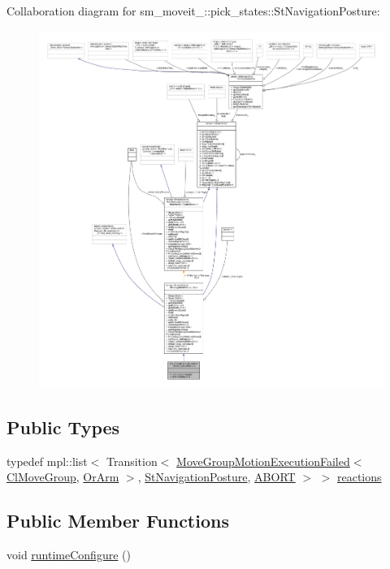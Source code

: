 Collaboration diagram for sm\+\_\+moveit\+\_\+:\+:pick\+\_\+states\+:\+:St\+Navigation\+Posture\+:
\nopagebreak
\begin{figure}[H]
\begin{center}
\leavevmode
\includegraphics[width=350pt]{structsm__moveit__4_1_1pick__states_1_1StNavigationPosture__coll__graph}
\end{center}
\end{figure}
\subsection*{Public Types}
\begin{DoxyCompactItemize}
\item 
typedef mpl\+::list$<$ Transition$<$ \hyperlink{structmoveit__z__client_1_1MoveGroupMotionExecutionFailed}{Move\+Group\+Motion\+Execution\+Failed}$<$ \hyperlink{classmoveit__z__client_1_1ClMoveGroup}{Cl\+Move\+Group}, \hyperlink{classsm__moveit__4_1_1OrArm}{Or\+Arm} $>$, \hyperlink{structsm__moveit__4_1_1pick__states_1_1StNavigationPosture}{St\+Navigation\+Posture}, \hyperlink{classABORT}{A\+B\+O\+RT} $>$ $>$ \hyperlink{structsm__moveit__4_1_1pick__states_1_1StNavigationPosture_a8f3ad7c040b08e1da62aabb3caa6a8e9}{reactions}
\end{DoxyCompactItemize}
\subsection*{Public Member Functions}
\begin{DoxyCompactItemize}
\item 
void \hyperlink{structsm__moveit__4_1_1pick__states_1_1StNavigationPosture_a224f91484ed745b360dd97c0fef63567}{runtime\+Configure} ()
\end{DoxyCompactItemize}
